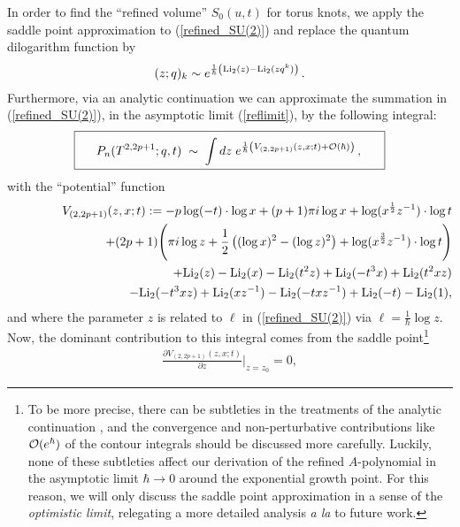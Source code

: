 \documentclass[hyper,letterpaper]{JHEP3}
\newcommand{\be}{\begin{equation}}
\newcommand{\ee}{\end{equation}}
\begin{document}
In order to find the ``refined volume'' $S_0(u,t)$ for torus knots,
we apply the saddle point approximation \cite{Hikami_exp,Hikami:2007zz}
to (\ref{refined_SU(2)})
and replace the quantum dilogarithm function by
\begin{eqnarray}
(z;q)_{k}\sim e^{\frac{1}{\hbar}\left({\rm Li}_2(z)-{\rm Li}_2(zq^k)\right)} \,.
\label{q-dilog_approx}
\end{eqnarray}
Furthermore, via an analytic continuation we can approximate the summation in (\ref{refined_SU(2)}),
in the asymptotic limit (\ref{reflimit}), by the following integral:
\be
\boxed{\phantom{\int^1}
P_{n}(T^{2,2p+1};q,t) \; \sim \; \int dz\; e^{\frac{1}{\hbar}\left(V_{(2,2p+1)}(z,x;t)+{\cal O}(\hbar)\right)} \,, \phantom{\int^1}}
\label{Pn-saddle}
\ee
with the ``potential'' function
\begin{eqnarray}
&& V_{(2,2p+1)}(z,x;t)
:=-p\log (-t)\cdot \log x+(p+1)\pi i\log x+\log (x^{\frac{1}{2}}z^{-1})\cdot\log t
\nonumber \\
&&\quad\quad\quad\quad\quad\quad\quad
+(2p+1)\Biggl(
\pi i\log z+\frac{1}{2}\left((\log x)^2-(\log z)^2\right)
+\log (x^{\frac{3}{2}}z^{-1})\cdot \log t\Biggr)
\nonumber \\
&&\quad\quad\quad\quad\quad\quad\quad
+{\rm Li}_2(z)-{\rm Li}_2(x)-{\rm Li}_2(t^2z)+{\rm Li}_2(-t^3x)
+{\rm Li}_2(t^2xz)
\nonumber \\
&&\quad\quad\quad\quad\quad\quad\quad
-{\rm Li}_2(-t^3xz)
+{\rm Li}_2(xz^{-1})
-{\rm Li}_2(-txz^{-1})
+{\rm Li}_2(-t)-{\rm Li}_2(1),
\end{eqnarray}
and where the parameter $z$ is related to $\ell$ in (\ref{refined_SU(2)}) via $\ell=\frac{1}{\hbar}\log z$.
Now, the dominant contribution to this integral comes from the saddle point\footnote{To be more precise,
there can be subtleties in the treatments of the analytic continuation \cite{Wit-anal},
and the convergence and non-perturbative contributions like ${\cal O}(e^{\hbar})$
of the contour integrals should be discussed more carefully.
Luckily, none of these subtleties affect our derivation of the refined $A$-polynomial
in the asymptotic limit $\hbar\to 0$ around the exponential growth point.
For this reason, we will only discuss the saddle point approximation
in a sense of the {\it optimistic limit}, relegating a more detailed
analysis {\it a la} \cite{Kashaev_Tirkkonen,Murakami_torus,Hikami_Murakami1,Hikami_Murakami2} to future work.}
\begin{eqnarray}
\frac{\partial V_{(2,2p+1)}(z,x;t)}{\partial z}\Bigg|_{z=z_0}=0,
\label{saddle_point}
\end{eqnarray}
\end{document}
